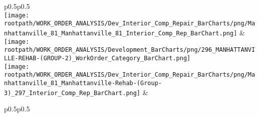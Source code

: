                         \begin{center}
                        \tablehead{\hspace{1cm}\\}
                        \tabletail{\hspace{1cm}\\}
                        \begin{supertabular}{p{0.5\textwidth}p{0.5\textwidth}}
                         \\
                        \texttt{[image: \\rootpath/WORK\_ORDER\_ANALYSIS/Dev\_Interior\_Comp\_Repair\_BarCharts/png/Manhattanville\_81\_Manhattanville\_81\_Interior\_Comp\_Rep\_BarChart.png]} & \texttt{[image: \\rootpath/WORK\_ORDER\_ANALYSIS/Development\_BarCharts/png/296\_MANHATTANVILLE-REHAB-(GROUP-2)\_WorkOrder\_Category\_BarChart.png]} \\
                                        \texttt{[image: \\rootpath/WORK\_ORDER\_ANALYSIS/Dev\_Interior\_Comp\_Repair\_BarCharts/png/Manhattanville\_81\_Manhattanville-Rehab-(Group-3)\_297\_Interior\_Comp\_Rep\_BarChart.png]} &  \hspace{1cm} \\
                                        \end{supertabular}
\end{center}

                        \begin{center}
                        \tablehead{\hspace{1cm}\\}
                        \tabletail{\hspace{1cm}\\}
                        \begin{supertabular}{p{0.5\textwidth}p{0.5\textwidth}}
                         \\
                         \\
                                    \end{supertabular}
                                    \end{center}
                                    